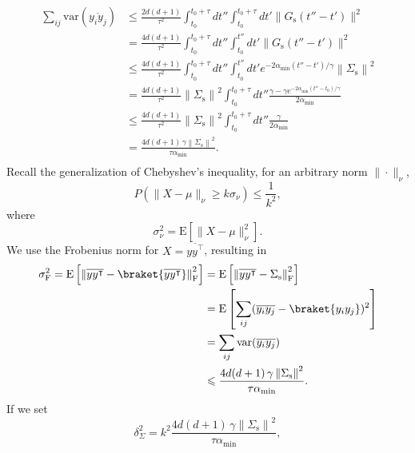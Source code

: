 \documentclass[prx,onecolumn,floatfix,longbibliography,notitlepage, nofootinbib,12pt]{revtex4-2}
\renewcommand{\geq}{\geqslant}
\renewcommand{\leq}{\leqslant}
\begin{document}
\begin{appendix}
\begin{align}
    \sum_{ij}\text{var}(\overline{y_i y_j})
    &\leq \frac{2d(d+1)}{\tau^2}\int_{t_0}^{t_0 + \tau} dt'' \int_{t_0}^{t_0 + \tau} dt'\|G_\text{s}(t'' - t')\|^2\\
    & =  \frac{4d(d+1)}{\tau^2}\int_{t_0}^{t_0 + \tau} dt'' \int_{t_0}^{t''} dt'\|G_\text{s}(t'' - t')\|^2 \\ 
    & \leq   \frac{4d(d+1)}{\tau^2}\int_{t_0}^{t_0 + \tau} dt'' \int_{t_0}^{t''} dt'e^{-2\alpha_\text{min} (t'' - t')/\gamma} \left\| \Sigma_\text{s}\right\|^2 \\
    &=
\frac{4d(d+1)}{\tau^2} \left\| \Sigma_\text{s}\right\|^2\int_{t_0}^{t_0 + \tau}dt'' \frac{\gamma-\gamma e^{-2\alpha_\text{min}(t'' - t_0)/\gamma}}{2\alpha_\text{min}} \\
& \leq 
\frac{4d(d+1)}{\tau^2} \left\| \Sigma_\text{s}\right\|^2\int_{t_0}^{t_0 + \tau}dt'' \frac{\gamma}{2\alpha_\text{min}} \\
& = \frac{4 d (d+1) \,\gamma\left\| \Sigma_\text{s}\right\|^2}{\tau \alpha_\text{min}}. \\
\end{align}
Recall the generalization of Chebyshev's inequality, for an arbitrary norm $\|\cdot\|_\nu$,
\begin{equation}
    P\left( \|X-\mu\|_\nu \geq k \sigma_\nu\right) \leq \frac{1}{k^2},
\end{equation}
where
\begin{equation}
    \sigma_\nu^2 = \text{E}[\|X - \mu\|_\nu^2].
\end{equation}
We use the Frobenius norm for $X = \overline{y y^\intercal}$, resulting in
\begin{align}
    \sigma_\text{F}^2 = \text{E}\left[ \left\|
    \overline{yy^\intercal} - \braket{\overline{y y^\intercal}}
    \right\|^2_\text{F}\right] &= 
    \text{E}\left[ \left\|
    \overline{yy^\intercal} - \Sigma_\text{s}
    \right\|_\text{F}^2\right]\\
    &= 
    \text{E}\left[ \sum_{ij} (\overline{y_i y_j} - \braket{y_i y_j})^2\right]\\
    & = \sum_{ij} \text{var}(\overline{y_i y_j})\\
    &\leq \frac{4 d (d+1) \,\gamma\left\| \Sigma_\text{s}\right\|^2}{\tau \alpha_\text{min}}
.
\end{align}
If we set
\begin{equation}
    \delta_\Sigma^2 = k^2\frac{4 d (d+1) \,\gamma\left\| \Sigma_\text{s}\right\|^2}{\tau \alpha_\text{min}},
\end{equation}

\end{appendix}
\end{document}
